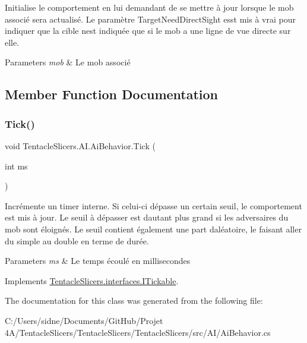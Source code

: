 Initialise le comportement en lui demandant de se mettre à jour lorsque le mob associé sera actualisé. Le paramètre Target\+Need\+Direct\+Sight esst mis à vrai pour indiquer que la cible n\textquotesingle{}est indiquée que si le mob a une ligne de vue directe sur elle. 


\begin{DoxyParams}{Parameters}
{\em mob} & Le mob associé \\
\hline
\end{DoxyParams}


\subsection{Member Function Documentation}
\mbox{\label{class_tentacle_slicers_1_1_a_i_1_1_ai_behavior_acec78a17fc2bc5784aa12ef11e11a685}} 
\subsubsection{\texorpdfstring{Tick()}{Tick()}}
{\footnotesize\ttfamily void Tentacle\+Slicers.\+A\+I.\+Ai\+Behavior.\+Tick (\begin{DoxyParamCaption}\item[{int}]{ms }\end{DoxyParamCaption})}



Incrémente un timer interne. Si celui-\/ci dépasse un certain seuil, le comportement est mis à jour. Le seuil à dépasser est d\textquotesingle{}autant plus grand si les adversaires du mob sont éloignés. Le seuil contient également une part d\textquotesingle{}aléatoire, le faisant aller du simple au double en terme de durée. 


\begin{DoxyParams}{Parameters}
{\em ms} & Le temps écoulé en millisecondes \\
\hline
\end{DoxyParams}


Implements \hyperlink{interface_tentacle_slicers_1_1interfaces_1_1_i_tickable}{Tentacle\+Slicers.\+interfaces.\+I\+Tickable}.



The documentation for this class was generated from the following file\+:\begin{DoxyCompactItemize}
\item 
C\+:/\+Users/sidne/\+Documents/\+Git\+Hub/\+Projet 4\+A/\+Tentacle\+Slicers/\+Tentacle\+Slicers/\+Tentacle\+Slicers/src/\+A\+I/Ai\+Behavior.\+cs\end{DoxyCompactItemize}
